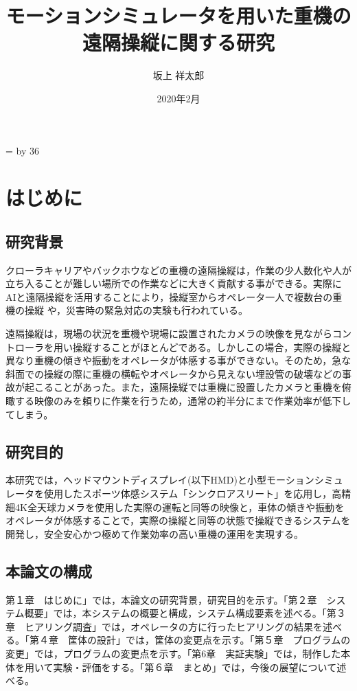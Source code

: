 \documentclass[10pt,a4paper]{jsarticle}
\title{モーションシミュレータを用いた重機の遠隔操縦に関する研究} %
\date{2020年2月} %
\author{坂上 祥太郎} %
\def\linesparpage#1{
    \baselineskip=\textheight
    \divide\baselineskip by #1
}
\begin{document}
\linesparpage{36} %

\begin{titlepage}
\maketitle
\thispagestyle{empty}
\end{titlepage}

\tableofcontents
\thispagestyle{empty}
\newpage

\setcounter{page}{1}
\pagestyle{plain}

\section{はじめに}

\subsection{研究背景}
クローラキャリアやバックホウなどの重機の遠隔操縦は，作業の少人数化や人が立ち入ることが難しい場所での作業などに大きく貢献する事ができる。実際にAIと遠隔操縦を活用することにより，操縦室からオペレータ一人で複数台の重機の操縦 \cite{hoge}や，災害時の緊急対応の実験\cite{hoge}も行われている。

遠隔操縦は，現場の状況を重機や現場に設置されたカメラの映像を見ながらコントローラを用い操縦することがほとんどである。しかしこの場合，実際の操縦と異なり重機の傾きや振動をオペレータが体感する事ができない。そのため，急な斜面での操縦の際に重機の横転やオペレータから見えない埋設管の破壊などの事故が起こることがあった。また，遠隔操縦では重機に設置したカメラと重機を俯瞰する映像のみを頼りに作業を行うため，通常の約半分にまで作業効率が低下してしまう。\cite{hoge}


\subsection{研究目的}
本研究では，ヘッドマウントディスプレイ(以下HMD)と小型モーションシミュレータを使用したスポーツ体感システム「シンクロアスリート」を応用し，高精細4K全天球カメラを使用した実際の運転と同等の映像と，車体の傾きや振動をオペレータが体感することで，実際の操縦と同等の状態で操縦できるシステムを開発し，安全安心かつ極めて作業効率の高い重機の運用を実現する。

\subsection{本論文の構成}
第１章　はじめに」では，本論文の研究背景，研究目的を示す。「第２章　システム概要」では，本システムの概要と構成，システム構成要素を述べる。「第３章　ヒアリング調査」では，オペレータの方に行ったヒアリングの結果を述べる。「第４章　筐体の設計」では，筐体の変更点を示す。「第５章　プログラムの変更」では，プログラムの変更点を示す。「第6章　実証実験」では，制作した本体を用いて実験・評価をする。「第６章　まとめ」では，今後の展望について述べる。
\end{document}
